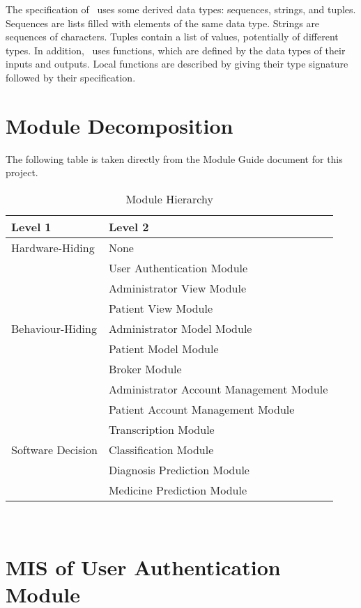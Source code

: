 \documentclass[12pt, titlepage]{article}
\begin{document}
\noindent
The specification of \progname \ uses some derived data types: sequences, strings, and
tuples. Sequences are lists filled with elements of the same data type. Strings
are sequences of characters. Tuples contain a list of values, potentially of
different types. In addition, \progname \ uses functions, which
are defined by the data types of their inputs and outputs. Local functions are
described by giving their type signature followed by their specification.

\section{Module Decomposition}

The following table is taken directly from the Module Guide document for this project.

\begin{table}[h!]
\centering
\begin{tabular}{p{} p{}}
\toprule
\textbf{Level 1} & \textbf{Level 2}\\
\midrule
{Hardware-Hiding} & None \\
\midrule
\multirow{7}{0.3\textwidth}{Behaviour-Hiding} & User Authentication Module\\
& Administrator View Module\\
& Patient View Module\\
& Administrator Model Module\\
& Patient Model Module\\
& Broker Module\\
& Administrator Account Management Module\\
& Patient Account Management Module\\
\midrule
\multirow{3}{0.3\textwidth}{Software Decision} & Transcription Module\\
& Classification Module\\
& Diagnosis Prediction Module\\
& Medicine Prediction Module\\
\bottomrule
\end{tabular}
\caption{Module Hierarchy}
\label{TblMH}
\end{table}

\newpage
~\newpage

\section{MIS of User Authentication Module} \label{Module_UserAuth}
\end{document}
